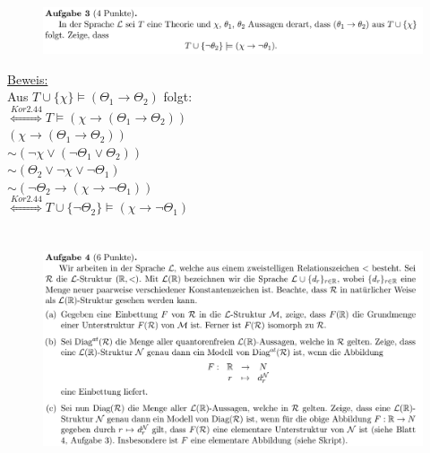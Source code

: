 \documentclass[a4paper]{scrartcl}
\begin{document}
\section*{}%
\label{sec:aufgabe_3}

    \begin{figure}[H]
        \centering
        \includegraphics[scale=0.3]{./A-3.png}
        \label{fig:}
    \end{figure}

    \underline{Beweis:}\\
        Aus $T \cup \{\chi\} \vDash (\Theta_1 \rightarrow \Theta_2)$ folgt:\\
    $\overset{Kor 2.44}{\Leftrightarrow} T \vDash (\chi \rightarrow (\Theta_1 \rightarrow \Theta_2))$\\
        $(\chi \rightarrow (\Theta_1 \rightarrow \Theta_2))$\\
        $\sim (\neg \chi \lor (\neg \Theta_1 \lor \Theta_2))$\\
        $\sim (\Theta_2 \lor \neg \chi \lor \neg \Theta_1)$\\
        $\sim (\neg \Theta_2 \rightarrow (\chi \rightarrow \neg \Theta_1))$\\
        $\overset{Kor 2.44}{\Leftrightarrow} T \cup \{\neg \Theta_2\} \vDash (\chi \rightarrow \neg \Theta_1)$\\


\section*{}%
\label{sec:aufgabe_4}

    \begin{figure}[H]
        \centering
        \includegraphics[scale=0.3]{./A-4.png}
        \label{fig:}
    \end{figure}
\end{document}
